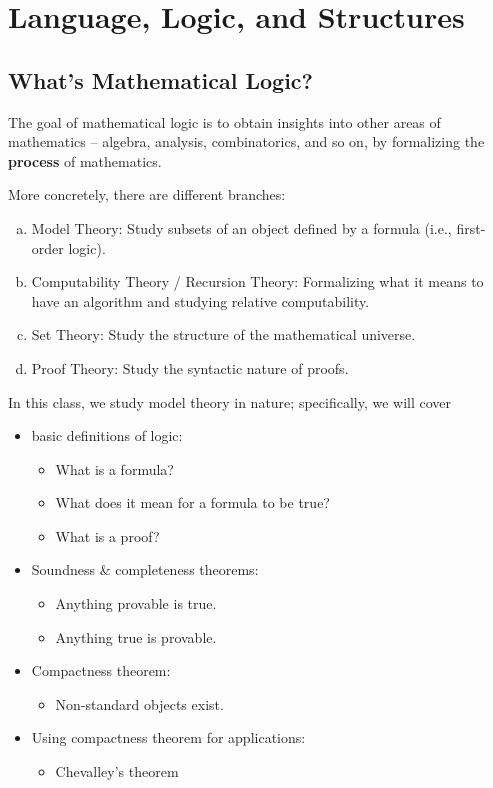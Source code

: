 \chapter{Language, Logic, and Structures}
\section{What's Mathematical Logic?}
The goal of mathematical logic is to obtain insights into other areas of mathematics -- algebra, analysis, combinatorics, and so on, by formalizing the \textbf{process} of mathematics.

\begin{remark}
	More concretely, there are different branches:
	\begin{enumerate}[(a)]
		\item Model Theory: Study subsets of an object defined by a formula (i.e., first-order logic).
		\item Computability Theory / Recursion Theory: Formalizing what it means to have an algorithm and studying relative computability.
		\item Set Theory: Study the structure of the mathematical universe.
		\item Proof Theory: Study the syntactic nature of proofs.
	\end{enumerate}
\end{remark}

In this class, we study model theory in nature; specifically, we will cover
\begin{itemize}
	\item basic definitions of logic:
	      \begin{itemize}
		      \item What is a formula?
		      \item What does it mean for a formula to be true?
		      \item What is a proof?
	      \end{itemize}
	\item Soundness \& completeness theorems:
	      \begin{itemize}
		      \item Anything provable is true.
		      \item Anything true is provable.
	      \end{itemize}
	\item Compactness theorem:
	      \begin{itemize}
		      \item Non-standard objects exist.
	      \end{itemize}
	\item Using compactness theorem for applications:
	      \begin{itemize}
		      \item Chevalley's theorem
	      \end{itemize}
\end{itemize}

